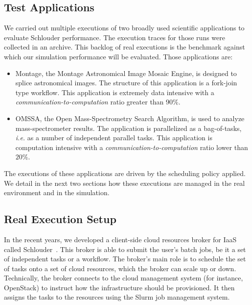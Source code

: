 \documentclass[]{llncs}
\begin{document}
\subsection{Test Applications}\label{sc:setup}

We  carried out  multiple executions  of two broadly used scientific  applications
to  evaluate Schlouder  performance. The execution traces for  those runs were
collected  in an  archive.  This backlog  of real  executions  is the  benchmark
against which  our simulation  performance will  be evaluated.  Those applications
are:

\begin{itemize}
\item Montage\cite{montage2009},  the Montage Astronomical Image  Mosaic Engine,
  is designed to  splice astronomical images. The structure  of this application
  is a  fork-join type  workflow. This application  is extremely  data intensive
  with a \emph{communication-to-computation} ratio greater than $90\%$.

\item OMSSA\cite{Geer2004}, the Open Mass-Spectrometry Search Algorithm, is used
  to analyze  mass-spectrometer results.  The application  is parallelized  as a
  bag-of-tasks, \textit{i.e.}  as a  number of  independent parallel tasks. This
  application        is        computation        intensive        with        a
  \emph{communication-to-computation} ratio lower than $20\%$.
\end{itemize}

The executions of these applications are driven
by the scheduling policy applied. We detail in the next two sections how these
executions are managed in the real environment and in the simulation.  

\subsection{Real Execution Setup}

In the recent years, we developed  a client-side cloud resources broker for IaaS
called  Schlouder~\cite{Michon17}.  This  broker is  able to  submit the  user's
batch jobs, be  it a set of  independent tasks or a workflow.   The broker's main
role is  to schedule the set  of tasks onto a  set of cloud resources,  which the
broker can scale up  or down.
Technically, the broker  connects to the cloud management  system (for instance,
OpenStack) to  instruct how  the infrastructure should  be provisioned. It then
assigns the tasks to the resources using the Slurm job management system.
\end{document}
